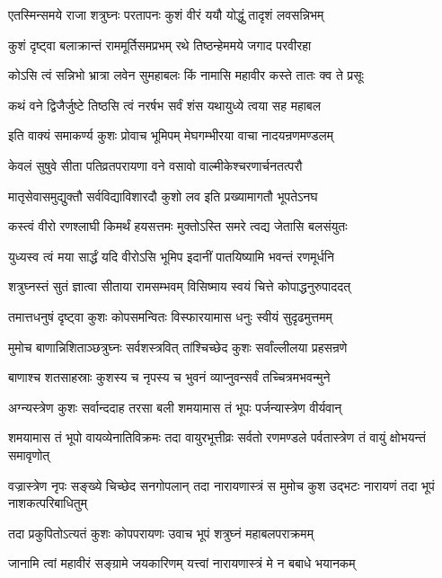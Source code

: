 \twolineshloka
{एतस्मिन्समये राजा शत्रुघ्नः परतापनः}
{कुशं वीरं ययौ योद्धुं तादृशं लवसन्निभम्}%

\twolineshloka
{कुशं दृष्ट्वा बलाक्रान्तं राममूर्तिसमप्रभम्}
{रथे तिष्ठन्हेममये जगाद परवीरहा}%


\twolineshloka
{कोऽसि त्वं सन्निभो भ्रात्रा लवेन सुमहाबलः}
{किं नामासि महावीर कस्ते तातः क्व ते प्रसूः}%

\twolineshloka
{कथं वने द्विजैर्जुष्टे तिष्ठसि त्वं नरर्षभ}
{सर्वं शंस यथायुध्ये त्वया सह महाबल}%

\twolineshloka
{इति वाक्यं समाकर्ण्य कुशः प्रोवाच भूमिपम्}
{मेघगम्भीरया वाचा नादयन्रणमण्डलम्}%

\twolineshloka
{केवलं सुषुवे सीता पतिव्रतपरायणा}
{वने वसावो वाल्मीकेश्चरणार्चनतत्परौ}%

\twolineshloka
{मातृसेवासमुद्युक्तौ सर्वविद्याविशारदौ}
{कुशो लव इति प्रख्यामागतौ भूपतेऽनघ}%

\twolineshloka
{कस्त्वं वीरो रणश्लाघी किमर्थं हयसत्तमः}
{मुक्तोऽस्ति समरे त्वद्य जेतासि बलसंयुतः}%

\twolineshloka
{युध्यस्व त्वं मया सार्द्धं यदि वीरोऽसि भूमिप}
{इदानीं पातयिष्यामि भवन्तं रणमूर्धनि}%

\twolineshloka
{शत्रुघ्नस्तं सुतं ज्ञात्वा सीताया रामसम्भवम्}
{विसिष्माय स्वयं चित्ते कोपाद्धनुरुपाददत्}%

\twolineshloka
{तमात्तधनुषं दृष्ट्वा कुशः कोपसमन्वितः}
{विस्फारयामास धनुः स्वीयं सुदृढमुत्तमम्}%

\twolineshloka
{मुमोच बाणान्निशिताञ्छत्रुघ्नः सर्वशस्त्रवित्}
{तांश्चिच्छेद कुशः सर्वांल्लीलया प्रहसन्रणे}%

\twolineshloka
{बाणाश्च शतसाहस्राः कुशस्य च नृपस्य च}
{भुवनं व्याप्नुवन्सर्वं तच्चित्रमभवन्मुने}%

\twolineshloka
{अग्न्यस्त्रेण कुशः सर्वान्ददाह तरसा बली}
{शमयामास तं भूपः पर्जन्यास्त्रेण वीर्यवान्}%


\threelineshloka
{शमयामास तं भूपो वायव्येनातिविक्रमः}
{तदा वायुरभूत्तीव्रः सर्वतो रणमण्डले}
{पर्वतास्त्रेण तं वायुं क्षोभयन्तं समावृणोत्}%

\threelineshloka
{वज्रास्त्रेण नृपः सङ्ख्ये चिच्छेद सनगोपलान्}
{तदा नारायणास्त्रं स मुमोच कुश उद्भटः}
{नारायणं तदा भूपं नाशकत्परिबाधितुम्}%

\twolineshloka
{तदा प्रकुपितोऽत्यतं कुशः कोपपरायणः}
{उवाच भूपं शत्रुघ्नं महाबलपराक्रमम्}%

\twolineshloka
{जानामि त्वां महावीरं सङ्ग्रामे जयकारिणम्}
{यत्त्वां नारायणास्त्रं मे न बबाधे भयानकम्}%

